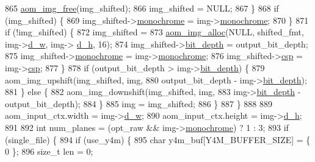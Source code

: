 \begin{DoxyCodeInclude}
{{{{{{{{{{{{{{{{{{{{{{{{{{{{{{{{{{{{{{{{{{{{{{865               \hyperlink{aom__image_8h_afff22f7f3eb9409c5b678d1962f110a8}{aom\_img\_free}(img\_shifted);
866               img\_shifted = NULL;
867             \}
868             \textcolor{keywordflow}{if} (img\_shifted) \{
869               img\_shifted->\hyperlink{structaom__image_ab7886616025ff8bd0bb96d967fca9ad8}{monochrome} = img->\hyperlink{structaom__image_ab7886616025ff8bd0bb96d967fca9ad8}{monochrome};
870             \}
871             \textcolor{keywordflow}{if} (!img\_shifted) \{
872               img\_shifted =
873                   \hyperlink{aom__image_8h_a570db29fbd122951235a08fe9375f6bb}{aom\_img\_alloc}(NULL, shifted\_fmt, img->\hyperlink{structaom__image_a89f80b1f58d608b9d2080635f4359034}{d\_w}, img->
      \hyperlink{structaom__image_ab986419a1f0fff93a2dc505f47194988}{d\_h}, 16);
874               img\_shifted->\hyperlink{structaom__image_a46ed9ffd741938d306a0db5a24bdcf8e}{bit\_depth} = output\_bit\_depth;
875               img\_shifted->\hyperlink{structaom__image_ab7886616025ff8bd0bb96d967fca9ad8}{monochrome} = img->\hyperlink{structaom__image_ab7886616025ff8bd0bb96d967fca9ad8}{monochrome};
876               img\_shifted->\hyperlink{structaom__image_a4f235c521bc95a061e9e0b2a3d5d457e}{csp} = img->\hyperlink{structaom__image_a4f235c521bc95a061e9e0b2a3d5d457e}{csp};
877             \}
878             \textcolor{keywordflow}{if} (output\_bit\_depth > img->\hyperlink{structaom__image_a46ed9ffd741938d306a0db5a24bdcf8e}{bit\_depth}) \{
879               aom\_img\_upshift(img\_shifted, img,
880                               output\_bit\_depth - img->\hyperlink{structaom__image_a46ed9ffd741938d306a0db5a24bdcf8e}{bit\_depth});
881             \} \textcolor{keywordflow}{else} \{
882               aom\_img\_downshift(img\_shifted, img,
883                                 img->\hyperlink{structaom__image_a46ed9ffd741938d306a0db5a24bdcf8e}{bit\_depth} - output\_bit\_depth);
884             \}
885             img = img\_shifted;
886           \}
887         \}
888 
889         aom\_input\_ctx.width = img->\hyperlink{structaom__image_a89f80b1f58d608b9d2080635f4359034}{d\_w};
890         aom\_input\_ctx.height = img->\hyperlink{structaom__image_ab986419a1f0fff93a2dc505f47194988}{d\_h};
891 
892         \textcolor{keywordtype}{int} num\_planes = (opt\_raw && img->\hyperlink{structaom__image_ab7886616025ff8bd0bb96d967fca9ad8}{monochrome}) ? 1 : 3;
893         \textcolor{keywordflow}{if} (single\_file) \{
894           \textcolor{keywordflow}{if} (use\_y4m) \{
895             \textcolor{keywordtype}{char} y4m\_buf[Y4M\_BUFFER\_SIZE] = \{ 0 \};
896             \textcolor{keywordtype}{size\_t} len = 0;
}}}}}}}}}}}}}}}}}}}}}}}}}}}}}}}}}}}}}}}}}}}}}}
\end{DoxyCodeInclude}
